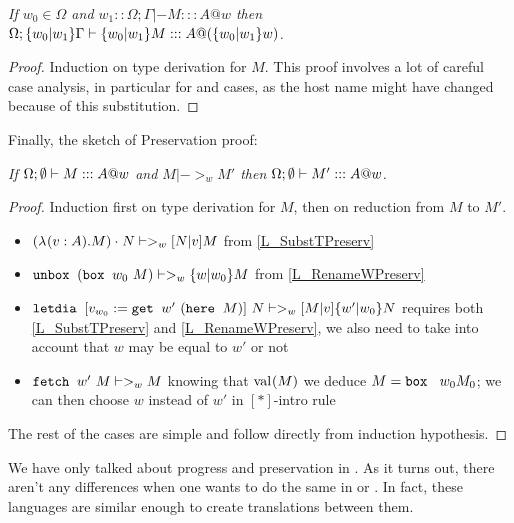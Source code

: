\begin{lemma}
\label{L_RenameWPreserv}\em
If $w_0 \in \Omega$ and ${w_1}::\Omega; \Gamma |- M ::: A @ w$ then\\
$\Omega; \mbox{$ \{w_0 | w_1 \} \Gamma$} |- \mbox{$ \{w_0 | w_1 \} M$} ::: A@(\mbox{$ \{w_0 | w_1 \} w$})$.
\begin{proof}
Induction on type derivation for $M$. This proof involves a lot of careful case analysis, in particular for \fetche{} and \gete{} cases, as the host name might have changed because of this substitution.
\end{proof}
\end{lemma}

Finally, the sketch of Preservation proof:

\begin{theorem}[Preservation]
\label{L_Preservation}\em
If $\Omega; \mbox{$\emptyset$} |- M ::: A @ w$ and $M |->_w M'$ then ${\Omega; \mbox{$\emptyset$} |- M' ::: A @ w}$.
\begin{proof}
Induction first on type derivation for $M$, then on reduction from $M$ to $M'$.
\begin{itemize}
\item $\mbox{$(\mbox{$\lambda_{} (v: A). M$}) \cdot_{} N$} |->_w \mbox{$ [N | v] M$}$ from \ref{L_SubstTPreserv}
\item $\mbox{$\operatorname{\texttt{unbox}}_{}\ {(}$}\mbox{$\operatorname{\texttt{box}}_{}\ {w_0}\ {M}$}) |->_{w} \mbox{$ \{w | w_0 \} M$}$ from \ref{L_RenameWPreserv}
\item $\mbox{$\operatorname{\texttt{letdia}}_{}\ {[{v}_{w_0} := \mbox{$\operatorname{\texttt{get}}_{}\ {w'}\ {(}$}\mbox{$\operatorname{\texttt{here}}_{}\ {M}$})]}\ {N}$} |->_w \mbox{$ [M | v] \mbox{$ \{w' | w_0 \} N$}$}$ requires both \ref{L_SubstTPreserv} and \ref{L_RenameWPreserv}, we also need to take into account that $w$ may be equal to $w'$ or not
\item $\mbox{$\operatorname{\texttt{fetch}}_{}\ {w'}\ {M}$} |->_w M$ knowing that $\mbox{$\mathrm{val}_{}{(M)}$}$ we deduce $M = \bbox {w_0} {M_0}$; we can then choose $w$ instead of $w'$ in $[*]$-intro rule
\end{itemize}
The rest of the cases are simple and follow directly from induction hypothesis.
\end{proof}
\end{theorem}

We have only talked about progress and preservation in \langL{}. As it turns out, there aren't any differences when one wants to do the same in \langLF{} or \langHyb{}. In fact, these languages are similar enough to create translations between them.